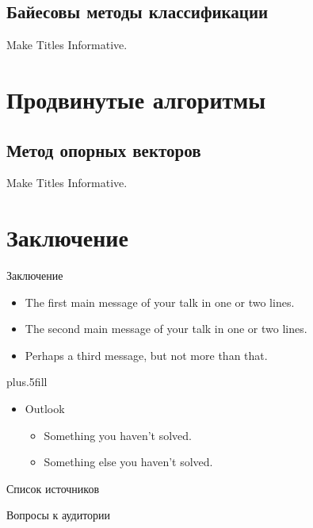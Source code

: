 \documentclass{beamer}
\begin{document}
\subsection{Байесовы методы классификации}

\begin{frame}{Make Titles Informative.}
\end{frame}

\section{Продвинутые алгоритмы}
\subsection{Метод опорных векторов}

\begin{frame}{Make Titles Informative.}
\end{frame}

\section{Заключение}

\begin{frame}{Заключение}

  \begin{itemize}
    \item
      The \alert{first main message} of your talk in one or two lines.
    \item
      The \alert{second main message} of your talk in one or two lines.
    \item
      Perhaps a \alert{third message}, but not more than that.
  \end{itemize}

  \vskip0pt plus.5fill
  \begin{itemize}
    \item
      Outlook
      \begin{itemize}
        \item
          Something you haven't solved.
        \item
          Something else you haven't solved.
      \end{itemize}
  \end{itemize}
\end{frame}

\begin{frame}[allowframebreaks]{Список источников} 
  \nocite{*}
  \printbibliography
\end{frame}

\begin{frame}{Вопросы к аудитории} 

\end{frame}

\begin{frame}
  \titlepage
\end{frame}
\end{document}
